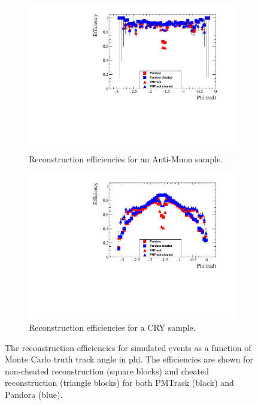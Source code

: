 \begin{figure}[h!]
  \centering
  \begin{subfigure}{0.45\textwidth}
    \centering
    \includegraphics[width=\textwidth]{Effic_AntiMuon_500V_All_Phi}
    \caption{Reconstruction efficiencies for an Anti-Muon sample.}
    \label{fig:SimEffic_Phi_AMu}
  \end{subfigure}
  \hspace{0.08\textwidth}
  \begin{subfigure}{0.45\textwidth}
    \centering
    \includegraphics[width=\textwidth]{Effic_Cosmics_500V_All_Phi}
    \caption{Reconstruction efficiencies for a CRY sample.}
    \label{fig:SimEffic_Phi_CRY}
  \end{subfigure}
  \caption[The reconstruction efficiencies for simulated events as a function of Monte Carlo truth track angle in phi.]
          {The reconstruction efficiencies for simulated events as a function of Monte Carlo truth track angle in phi. The efficiencies are shown for non-cheated reconstruction (square blocks) and cheated reconstruction (triangle blocks) for both PMTrack (black) and Pandora (blue).}
          \label{fig:SimEffic_Phi}
\end{figure}

